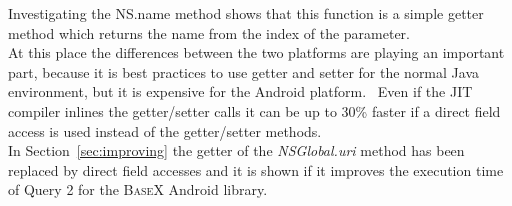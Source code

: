 Investigating the \textsf{NS.name} method shows that this function is a simple getter method which returns the name from the index of the parameter.\\
At this place the differences between the two platforms are playing an important part, because it is best practices to use getter and setter for the normal Java environment, but it is expensive for the Android platform.~\cite{toninievlautatingandroid}
Even if the JIT compiler inlines the getter/setter calls it can be up to 30\% faster if a direct field access is used instead of the getter/setter methods.~\cite{toninianalysis}\\
In Section~\ref{sec:improving} the getter of the \textit{NSGlobal.uri} method has been replaced by direct field accesses and it is shown if it improves the execution time of Query 2 for the \textsc{BaseX} Android library.


